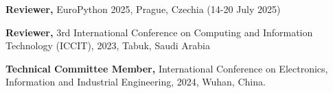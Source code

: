 
\begin{cvlistsection}
\item \textbf{Reviewer,} EuroPython 2025, Prague, Czechia (14-20 July 2025)
\item \textbf{Reviewer,} 3rd International Conference on Computing and Information Technology (ICCIT), 2023, Tabuk, Saudi Arabia
\item \textbf{Technical Committee Member,} International Conference on Electronics, Information and Industrial Engineering, 2024, Wuhan, China.
\end{cvlistsection}
